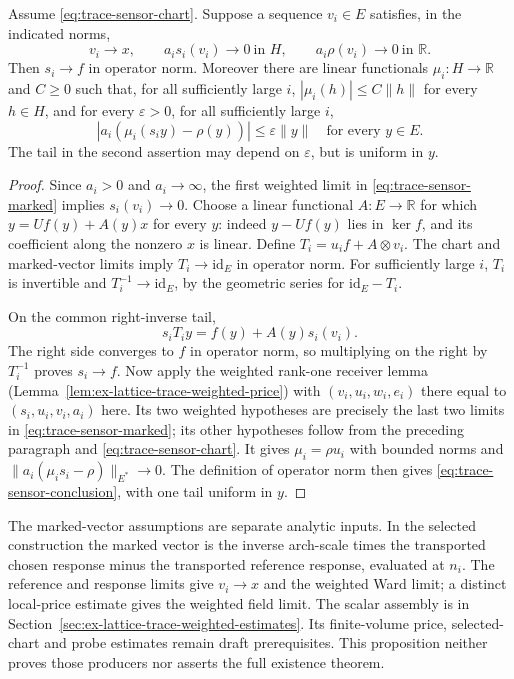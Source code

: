 \begin{proposition}
\label{prop:trace-prosper-sensor}
Assume \eqref{eq:trace-sensor-chart}. Suppose a sequence $v_i\in E$
satisfies, in the indicated norms,
\begin{equation}
 v_i\longrightarrow x,\qquad
 a_i s_i(v_i)\longrightarrow0\ \text{in }H,\qquad
 a_i\rho(v_i)\longrightarrow0\ \text{in }\mathbb R.
 \label{eq:trace-sensor-marked}
\end{equation}
Then $s_i\to f$ in operator norm. Moreover there are linear functionals
$\mu_i:H\to\mathbb R$ and $C\ge0$ such that, for all sufficiently large
$i$, $|\mu_i(h)|\le C\|h\|$ for every $h\in H$, and for every
$\varepsilon>0$, for all sufficiently large $i$,
\begin{equation}
 |a_i(\mu_i(s_i y)-\rho(y))|\le\varepsilon\|y\|
 \quad\text{for every }y\in E.
 \label{eq:trace-sensor-conclusion}
\end{equation}
The tail in the second assertion may depend on $\varepsilon$, but is uniform
in $y$.
\end{proposition}
\begin{proof}
Since $a_i>0$ and $a_i\to\infty$, the first weighted limit in
\eqref{eq:trace-sensor-marked} implies $s_i(v_i)\to0$. Choose a linear
functional $A:E\to\mathbb R$ for which
$y=Uf(y)+A(y)x$ for every $y$: indeed $y-Uf(y)$ lies in $\ker f$, and its
coefficient along the nonzero $x$ is linear. Define
$T_i=u_i f+A\otimes v_i$. The chart and marked-vector limits imply
$T_i\to\mathrm{id}_E$ in operator norm. For sufficiently large $i$, $T_i$
is invertible and $T_i^{-1}\to\mathrm{id}_E$, by the geometric series for
$\mathrm{id}_E-T_i$.

On the common right-inverse tail,
\[
 s_iT_i y=f(y)+A(y)s_i(v_i).
\]
The right side converges to $f$ in operator norm, so multiplying on the
right by $T_i^{-1}$ proves $s_i\to f$. Now apply the weighted rank-one
receiver lemma (Lemma~\ref{lem:ex-lattice-trace-weighted-price}) with
$(v_i,u_i,w_i,e_i)$ there equal to $(s_i,u_i,v_i,a_i)$ here. Its two
weighted hypotheses are precisely the last two limits in
\eqref{eq:trace-sensor-marked}; its other hypotheses follow from the
preceding paragraph and \eqref{eq:trace-sensor-chart}. It gives
$\mu_i=\rho u_i$ with bounded norms and
$\|a_i(\mu_i s_i-\rho)\|_{E^*}\to0$. The definition of operator norm
then gives \eqref{eq:trace-sensor-conclusion}, with one tail uniform in $y$.
\end{proof}

The marked-vector assumptions are separate analytic inputs. In the selected
construction the marked vector is the inverse arch-scale times the transported
chosen response minus the transported reference response, evaluated at
$n_i$. The reference and response limits give $v_i\to x$ and the weighted
Ward limit; a distinct local-price estimate gives the weighted field limit.
The scalar assembly is in Section~\ref{sec:ex-lattice-trace-weighted-estimates}.
Its finite-volume price, selected-chart and probe estimates remain draft
prerequisites. This proposition neither proves those producers nor asserts the
full existence theorem.
